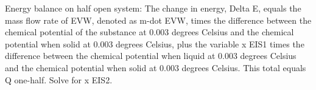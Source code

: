 Energy balance on half open system:
The change in energy, Delta E, equals the mass flow rate of EVW, denoted as m-dot EVW, times the difference between the chemical potential of the substance at 0.003 degrees Celsius and the chemical potential when solid at 0.003 degrees Celsius, plus the variable x EIS1 times the difference between the chemical potential when liquid at 0.003 degrees Celsius and the chemical potential when solid at 0.003 degrees Celsius. This total equals Q one-half.
Solve for x EIS2.